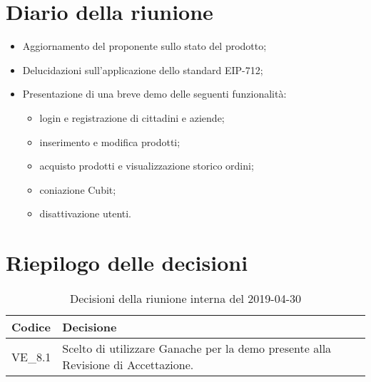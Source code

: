 \section{Diario della riunione}
\begin{itemize}
	\item Aggiornamento del proponente sullo stato del prodotto;
	\item Delucidazioni sull'applicazione dello standard EIP-712\glo;
	\item Presentazione di una breve demo delle seguenti funzionalità:
	\begin{itemize}
		\item login e registrazione di cittadini e aziende;
		\item inserimento e modifica prodotti;
		\item acquisto prodotti e visualizzazione storico ordini;
		\item coniazione Cubit;
		\item disattivazione utenti.
	\end{itemize}
\end{itemize}

\hspace{3cm}

\section{Riepilogo delle decisioni}

	
	\begin{longtable}{ >{\centering}p{} >{}p{}}
		\caption{Decisioni della riunione interna del 2019-04-30}\\	
		\rowcolorhead
		\textbf{\color{white}Codice} 
		& \centering\textbf{\color{white}Decisione} 
		\tabularnewline 
		\endfirsthead
		VE\_8.1 & Scelto di utilizzare Ganache per la demo presente alla Revisione di 
		Accettazione.
		
		
	\end{longtable}
	




